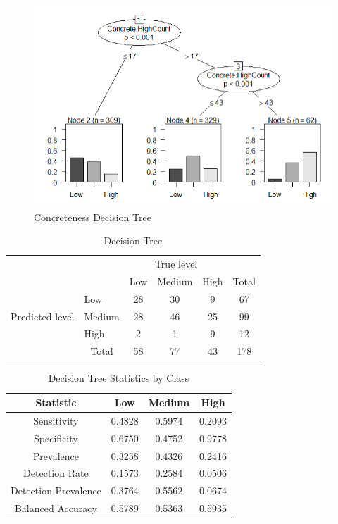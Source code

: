 \documentclass[12pt, a4paper]{article}
\begin{document}
\begin{figure}[ht]
\centerline{\includegraphics[scale=0.8]{decision_tree.png}}
\caption{Concreteness Decision Tree}
\label{decision_tree}
\end{figure}

\begin{table}[ht]
\centering
\begin{tabular}{l|l|c|c|c|c}
\multicolumn{2}{c}{}&\multicolumn{3}{c}{True level}&\\
\cline{3-5}
\multicolumn{2}{c|}{}&Low&Medium&High&\multicolumn{1}{c}{Total}\\
\cline{2-5}
\multirow{3}{*}{Predicted level}& Low & 28 & 30 & 9 & 67\\
\cline{2-5}
& Medium & 28 & 46 & 25 & 99\\
\cline{2-5}
& High & 2 & 1 & 9 & 12\\
\cline{2-5}
\multicolumn{1}{c}{} & \multicolumn{1}{c}{Total} & \multicolumn{1}{c}{58} & \multicolumn{    1}{c}{77} & \multicolumn{    1}{c}{43} & \multicolumn{1}{c}{178}\\
\end{tabular}
\caption{Decision Tree}
\label{table:decision_tree}
\end{table}

\begin{table}[ht]
\centering
\begin{tabular}{||c c c c||} 
 \hline
 Statistic & Low & Medium & High \\ [0.5ex] 
 \hline\hline
 Sensitivity & 0.4828 & 0.5974 & 0.2093 \\ 
 Specificity & 0.6750 & 0.4752 & 0.9778 \\
 Prevalence & 0.3258 & 0.4326 & 0.2416 \\
 Detection Rate & 0.1573 & 0.2584 & 0.0506 \\
 Detection Prevalence  & 0.3764 & 0.5562 & 0.0674 \\ 
 Balanced Accuracy  & 0.5789 & 0.5363 & 0.5935 \\ [1ex] 
 \hline

\end{tabular}
\caption{Decision Tree Statistics by Class}
\label{table:decisiontreestats}
\end{table}
\end{document}
